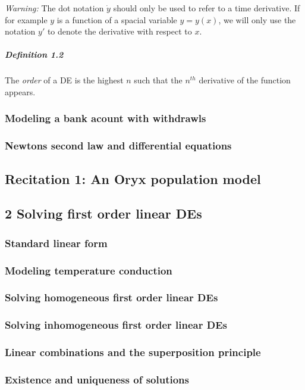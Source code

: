 \documentclass[8pt, a4paper]{article}
\begin{document}
\emph{\color{orange} Warning: } The dot notation $\dot{y}$ should only be used to refer to a time derivative. If for example $y$ is a function of a spacial variable $y=y(x)$, we will only use the notation $y'$ to denote the derivative with respect to $x$.\\

\subparagraph{Definition 1.2} The \emph{\color{blue} order} of a DE is the highest $n$ such that the $n^{th}$ derivative of the function appears.


\clearpage

\subsubsection{Modeling a bank acount with withdrawls}
\subsubsection{Newtons second law and differential equations}

\subsection{Recitation 1: An Oryx population model}

\subsection{2 Solving first order linear DEs}
\subsubsection{Standard linear form}
\subsubsection{Modeling temperature conduction}
\subsubsection{Solving homogeneous first order linear DEs}
\subsubsection{Solving inhomogeneous first order linear DEs}
\subsubsection{Linear combinations and the superposition principle}
\subsubsection{Existence and uniqueness of solutions}
\end{document}
